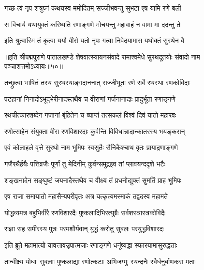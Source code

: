 \twolineshloka
{गच्छ त्वं नृप शत्रुघ्नं कथयस्व ममोदितम्}
{सज्जीभवन्तु सुभटा एष यामि रणे बली}%

\twolineshloka
{स विचार्य यथायुक्तं करिष्यति रणाङ्गणे}
{मोचयन्तु महावाहं न वामा मा ददन्तु ते}%


\twolineshloka
{इति श्रुत्वास्मि तं कृत्वा ययौ वीरो यतो नृपः}
{गत्वा निवेदयामास यथोक्तं सुरथेन वै}%

{॥इति श्रीपद्मपुराणे पातालखण्डे शेषवात्स्यायनसंवादे रामाश्वमेधे सुरथदूतयोः संवादो नाम पञ्चाशत्तमोऽध्यायः॥५०॥}

\resetShloka


\twolineshloka
{तच्छ्रुत्वा भाषितं तस्य सुरथस्याङ्गदाननात्}
{सज्जीभूता रणे सर्वे रथस्था रणकोविदाः}%

\twolineshloka
{पटहानां निनादोऽभूद्भेरीनादस्तथैव च}
{वीराणां गर्जनानादाः प्रादुर्भूता रणाङ्गणे}%

\twolineshloka
{रथचीत्कारशब्देन गजानां बृंहितेन च}
{व्याप्तं तत्सकलं विश्वं दिवं यातो महारवः}%

\twolineshloka
{रणोत्साहेन संयुक्ता वीरा रणविशारदाः}
{कुर्वन्ति विविधान्नादान्कातरस्य भयङ्करान्}%

\twolineshloka
{एवं कोलाहले वृत्ते सुरथो नाम भूमिपः}
{स्वसुतैः सैनिकैश्चाथ वृतः प्रायाद्रणाङ्गणे}%

\twolineshloka
{गजैरथैर्हयैः पत्तिव्रजैः पूर्णां तु मेदिनीम्}
{कुर्वन्समुद्रइव तां प्लावयन्ददृशे भटैः}%

\twolineshloka
{शङ्खनादेन सङ्घुष्टं जयनादैस्तथैव च}
{वीक्ष्य तं प्रधनोद्युक्तं सुमतिं प्राह भूमिपः}%


\twolineshloka
{एष राजा समायातो महासैन्यपरीवृतः}
{अत्र यत्कृत्यमस्माकं तद्वदस्व महामते}%


\twolineshloka
{योद्धव्यमत्र बहुभिर्वीरै रणविशारदैः}
{पुष्कलादिभिरत्युग्रैः सर्वशस्त्रास्त्रकोविदैः}%

\twolineshloka
{राज्ञा सह समीरस्य पुत्रः परमशौर्यवान्}
{युद्धं करोतु सुबलः परयुद्धविशारदः}%


\twolineshloka
{इति ब्रूते महामात्यो यावत्तावन्नृपात्मजाः}
{रणाङ्गणे धनूंष्यद्धा स्फारयामासुरुद्धताः}%

\twolineshloka
{तान्वीक्ष्य योधाः सुबलाः पुष्कलाद्या रणोत्कटाः}
{अभिजग्मुः स्यन्दनैः स्वैर्धनुर्बाणकरा मताः}%

